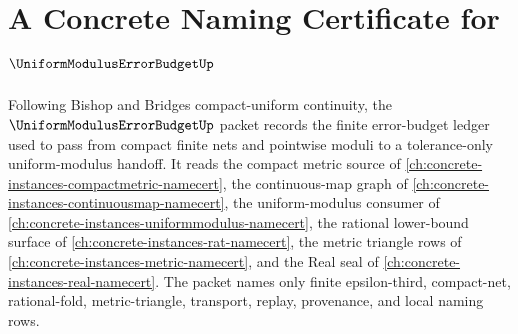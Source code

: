 \chapter{A Concrete Naming Certificate for $\UniformModulusErrorBudgetUp$}
\label{ch:concrete-instances-uniform-modulus-error-budget-namecert}

Following Bishop and Bridges compact-uniform continuity, the $\UniformModulusErrorBudgetUp$ packet records the finite error-budget ledger used to pass from compact finite nets and pointwise moduli to a tolerance-only uniform-modulus handoff. It reads the compact metric source of \autoref{ch:concrete-instances-compactmetric-namecert}, the continuous-map graph of \autoref{ch:concrete-instances-continuousmap-namecert}, the uniform-modulus consumer of \autoref{ch:concrete-instances-uniformmodulus-namecert}, the rational lower-bound surface of \autoref{ch:concrete-instances-rat-namecert}, the metric triangle rows of \autoref{ch:concrete-instances-metric-namecert}, and the Real seal of \autoref{ch:concrete-instances-real-namecert}. The packet names only finite epsilon-third, compact-net, rational-fold, metric-triangle, transport, replay, provenance, and local naming rows.

